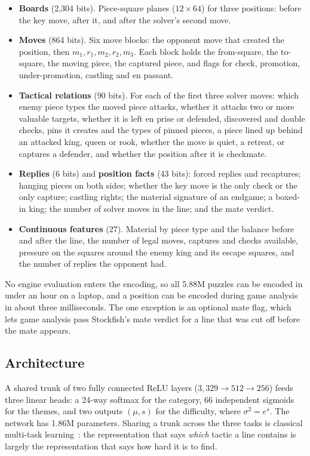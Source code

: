 \begin{itemize}
  \item \textbf{Boards} (2{,}304 bits). Piece-square planes ($12 \times 64$) for three positions:
        before the key move, after it, and after the solver's second move.
  \item \textbf{Moves} (864 bits). Six move blocks: the opponent move that created the position, then
        $m_1, r_1, m_2, r_2, m_3$. Each block holds the from-square, the to-square, the moving piece,
        the captured piece, and flags for check, promotion, under-promotion, castling and en passant.
  \item \textbf{Tactical relations} (90 bits). For each of the first three solver moves: which enemy
        piece types the moved piece attacks, whether it attacks two or more valuable targets, whether
        it is left en prise or defended, discovered and double checks, pins it creates and the types
        of pinned pieces, a piece lined up behind an attacked king, queen or rook, whether the move is
        quiet, a retreat, or captures a defender, and whether the position after it is checkmate.
  \item \textbf{Replies} (6 bits) and \textbf{position facts} (43 bits): forced replies and recaptures;
        hanging pieces on both sides; whether the key move is the only check or the only capture;
        castling rights; the material signature of an endgame; a boxed-in king; the number of solver
        moves in the line; and the mate verdict.
  \item \textbf{Continuous features} (27). Material by piece type and the balance before and after the
        line, the number of legal moves, captures and checks available, pressure on the squares around
        the enemy king and its escape squares, and the number of replies the opponent had.
\end{itemize}

No engine evaluation enters the encoding, so all 5.88M puzzles can be encoded in under an hour on a
laptop, and a position can be encoded during game analysis in about three milliseconds. The one
exception is an optional mate flag, which lets game analysis pass Stockfish's mate verdict for a line
that was cut off before the mate appears.

\subsection{Architecture}

A shared trunk of two fully connected ReLU layers ($3{,}329 \to 512 \to 256$) feeds three linear
heads: a 24-way softmax for the category, 66 independent sigmoids for the themes, and two outputs
$(\mu, s)$ for the difficulty, where $\sigma^2 = e^{s}$. The network has 1.86M parameters. Sharing a
trunk across the three tasks is classical multi-task learning~\cite{caruana1997multitask}: the
representation that says \emph{which} tactic a line contains is largely the representation that says
how hard it is to find.


